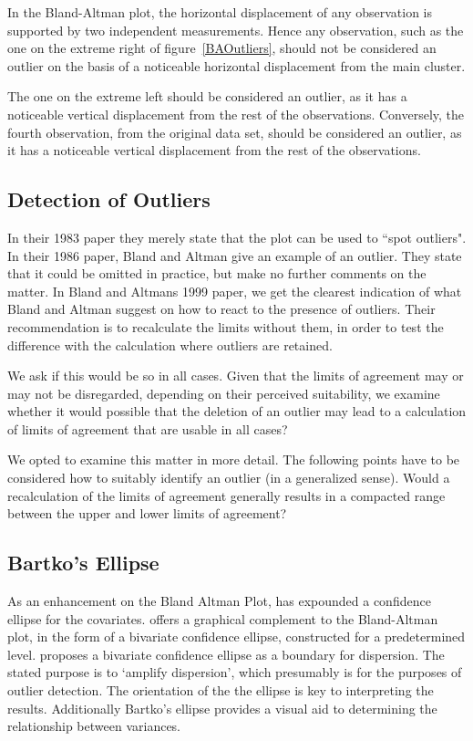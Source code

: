 \documentclass[12pt, a4paper]{report}
\theoremstyle{plain}
\theoremstyle{definition}
\theoremstyle{remark}
\begin{document}
In the Bland-Altman plot, the horizontal displacement of any observation is supported by two independent measurements. Hence any observation, such as the one on the extreme right of figure~\ref{BAOutliers}, should not be considered an outlier on the basis of a noticeable horizontal displacement from the main cluster. 

The one	on the extreme left should be considered an outlier, as it has a noticeable vertical displacement from the rest of the observations. Conversely, the fourth observation, from the original data set, should be considered an outlier, as it has a noticeable vertical displacement from the rest of the observations.







\subsection{Detection of Outliers}
In their 1983 paper they merely state that the plot can be used to
``spot outliers". In  their 1986 paper, Bland and Altman give an example of an
outlier. They state that it could be omitted in practice, but make
no further comments on the matter. In Bland and Altmans 1999 paper, we get the clearest indication of
what Bland and Altman suggest on how to react to the presence of
outliers. Their recommendation is to recalculate the limits
without them, in order to test the difference with the calculation
where outliers are retained.


We ask if this would be so in all cases. Given that the limits of
agreement may or may not be disregarded, depending on their
perceived suitability, we examine whether it would possible that
the deletion of an outlier may lead to a calculation of limits of
agreement that are usable in all cases?
 
We opted to examine this
matter in more detail. The following points have to be considered how to suitably identify an outlier (in a generalized sense). Would a recalculation of the limits of agreement generally results in a compacted range between the upper and lower limits of agreement?

\subsection{Bartko's Ellipse}




As an enhancement on the Bland Altman Plot, \citet{Bartko} has
expounded a confidence ellipse for the covariates. \citet{Bartko} offers a graphical complement to the Bland-Altman
plot, in the form of a bivariate confidence ellipse, constructed for a
predetermined level. \citet{Bartko} proposes
a bivariate confidence ellipse as a boundary for dispersion. The stated purpose is to `amplify dispersion', which presumably is for  the purposes of outlier detection. The orientation of the the ellipse is key to interpreting the results.
Additionally Bartko's ellipse provides a visual aid to determining the
relationship between variances. 
\end{document}
